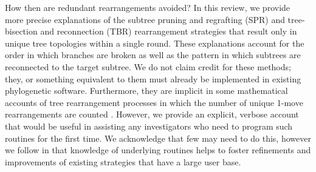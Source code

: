 \documentclass[12pt,letterpaper]{article}
\begin{document}
How then are redundant rearrangements avoided?
In this review, we provide more precise explanations of the subtree pruning and regrafting (SPR) and tree-bisection and reconnection (TBR) rearrangement strategies that result only in unique tree topologies within a single round. 
These explanations account for the order in which branches are broken as well as the pattern in which subtrees are reconnected to the target subtree.
We do not claim credit for these methods; they, or something equivalent to them must already be implemented in existing phylogenetic software.
Furthermore, they are implicit in some mathematical accounts of tree rearrangement processes in which the number of unique 1-move rearrangements are counted \citep{allen2001subtree}.
However, we provide an explicit, verbose account that would be useful in assisting any investigators who need to program such routines for the first time. 
We acknowledge that few may need to do this, however we follow \citet{goloboff1993character} in that knowledge of underlying routines helps to foster refinements and improvements of existing strategies that have a large user base.


\end{document}
